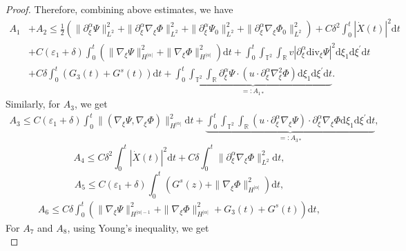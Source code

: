 \documentclass[10pt,a4paper]{amsart}
\newcommand{\ddiv}{\mathrm{div}}
\newcommand{\dif}{\mathrm{d}}
\begin{document}
\begin{proof}
Therefore, combining above estimates, we have
\begin{equation}\label{a1a2}
\begin{aligned}
A_1&+A_2\le \frac{1}{2}\left(\|\partial_\xi^\alpha\Psi\|_{L^2}^2+\|\partial_\xi^\alpha\nabla_\xi\Phi\|_{L^2}^2
+\|\partial_\xi^\alpha\Psi_0\|_{L^2}^2+\|\partial_\xi^\alpha\nabla_\xi\Phi_0\|_{L^2}^2\right)
+C\delta^2\int_0^t|\dot X(t)|^2\dif t\\
&
+C(\varepsilon_1+\delta)\int_0^t\left(\|\nabla_\xi\Psi\|_{H^{|\alpha|}}^2+\|\nabla_\xi\Phi\|_{H^{|\alpha|}}^2\right)\dif t
+\int_0^t\int_{\mathbb{T}^2}\int_{\mathbb{R}}
v|\partial_\xi^\alpha\ddiv_\xi\Psi|^2
\dif \xi_1\dif \xi^{\prime}\dif t
\\
&+C\delta\int_0^t\left(G_3(t)+G^s(t)\right)
\dif t
+\underbrace{\int_0^t\int_{\mathbb{T}^2}\int_{\mathbb{R}}\partial_\xi^\alpha\Psi\cdot\left(u\cdot\partial_\xi^\alpha\nabla_\xi^2\Phi\right)
\dif \xi_1\dif \xi^{\prime}\dif t}\limits_{=:A_{1\ast}}.
\end{aligned}
\end{equation}
Similarly, for $A_3$, we get
\begin{equation}\label{a3}
\begin{aligned}
A_3
\le C(\varepsilon_1+\delta)
\int_0^t\|(\nabla_\xi\Psi, \nabla_\xi\Phi)\|_{H^{|\alpha|}}^2\dif t
+\underbrace{\int_0^t\int_{\mathbb{T}^2}\int_{\mathbb{R}}\left( u\cdot\partial_\xi^\alpha\nabla_\xi\Psi\right)\cdot\partial_\xi^\alpha\nabla_\xi\Phi
\dif \xi_1\dif \xi^{\prime}\dif t}\limits_{=:A_{3\ast}},
\end{aligned}
\end{equation}
\begin{equation}\label{a4}
A_4\le C\delta^2\int_{0}^{t}|\dot{X}(t)|^2\dif t+C\delta\int_0^t\|\partial_\xi^\alpha\nabla_\xi\Phi\|_{L^2}^2\dif t,
\end{equation}
\begin{equation}\label{a5}
A_5\le C(\varepsilon_1+\delta)\int_0^t\left(G^s(z)+\|\nabla_\xi\Phi\|_{H^{|\alpha|}}^2\right)\dif t,
\end{equation}
\begin{equation}\label{a6}
\begin{aligned}
A_6\le C\delta\int_0^t\left(\|\nabla_\xi\Psi\|_{H^{|\alpha|-1}}^2+\|\nabla_\xi\Phi\|_{H^{|\alpha|}}^2+G_3(t)+G^s(t)\right)
\dif t,
\end{aligned}
\end{equation}
For $A_7$ and $A_8$, using Young's inequality, we get
\begin{equation}\label{a8}

\end{equation}
\end{proof}
\end{document}
